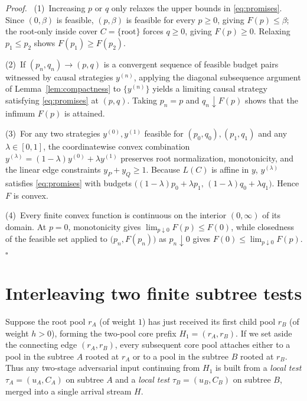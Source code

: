 \documentclass[11pt,letterpaper]{article}
\newenvironment{proof}[1][Proof]{\par\smallskip\noindent\textit{#1.}\ \ignorespaces}{\hfill$\square$\par\medskip}
\begin{document}
\begin{proof}
(1)~Increasing $p$ or $q$ only relaxes the upper bounds in \eqref{eq:promises}. Since $(0,\beta)$ is feasible, $(p,\beta)$ is feasible for every $p\ge 0$, giving $F(p)\le\beta$; the root-only inside cover $C=\{\text{root}\}$ forces $q\ge 0$, giving $F(p)\ge 0$. Relaxing $p_1\le p_2$ shows $F(p_1)\ge F(p_2)$.

(2)~If $(p_n,q_n)\to(p,q)$ is a convergent sequence of feasible budget pairs witnessed by causal strategies $y^{(n)}$, applying the diagonal subsequence argument of Lemma~\ref{lem:compactness} to $\{y^{(n)}\}$ yields a limiting causal strategy satisfying \eqref{eq:promises} at $(p,q)$. Taking $p_n=p$ and $q_n\downarrow F(p)$ shows that the infimum $F(p)$ is attained.

(3)~For any two strategies $y^{(0)},y^{(1)}$ feasible for $(p_0,q_0),(p_1,q_1)$ and any $\lambda\in[0,1]$, the coordinatewise convex combination $y^{(\lambda)}=(1-\lambda)y^{(0)}+\lambda y^{(1)}$ preserves root normalization, monotonicity, and the linear edge constraints $y_P+y_Q\ge 1$. Because $L(C)$ is affine in $y$, $y^{(\lambda)}$ satisfies \eqref{eq:promises} with budgets $\bigl((1-\lambda)p_0+\lambda p_1,\,(1-\lambda)q_0+\lambda q_1\bigr)$. Hence $F$ is convex.

(4)~Every finite convex function is continuous on the interior $(0,\infty)$ of its domain. At $p=0$, monotonicity gives $\lim_{p\downarrow 0} F(p)\le F(0)$, while closedness of the feasible set applied to $\bigl(p_n,F(p_n)\bigr)$ as $p_n\downarrow 0$ gives $F(0)\le\lim_{p\downarrow 0} F(p)$.
\end{proof}

\section{Interleaving two finite subtree tests}\label{sec:interleaving}

Suppose the root pool $r_A$ (of weight $1$) has just received its first child pool $r_B$ (of weight $h>0$), forming the two-pool core prefix $H_1=(r_A,r_B)$. If we set aside the connecting edge $(r_A,r_B)$, every subsequent core pool attaches either to a pool in the subtree $A$ rooted at $r_A$ or to a pool in the subtree $B$ rooted at $r_B$. Thus any two-stage adversarial input continuing from $H_1$ is built from a \emph{local test} $\tau_A=(u_A,C_A)$ on subtree $A$ and a \emph{local test} $\tau_B=(u_B,C_B)$ on subtree $B$, merged into a single arrival stream $H$.
\end{document}
